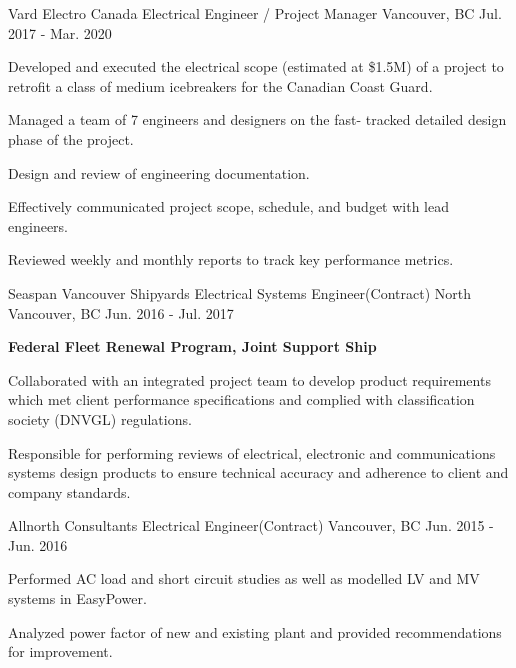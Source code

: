 \begin{cventries}
    \cventry
    {Vard Electro Canada} %
    {Electrical Engineer / Project Manager} %
    {Vancouver, BC} %
    {Jul. 2017 - Mar. 2020} %
    { %
        \begin{cvitems}
            \item {Developed and executed the electrical scope (estimated at \$1.5M) of a project to retrofit a class of medium icebreakers for the Canadian Coast Guard.}
            \item {Managed a team of 7 engineers and designers on the fast- tracked detailed design phase of the project.}
            \item {Design and review of engineering documentation.}
            \item {Effectively communicated project scope, schedule, and budget with lead engineers.}
            \item {Reviewed weekly and monthly reports to track key performance metrics.}
        \end{cvitems}
    }

    \cventry
    {Seaspan Vancouver Shipyards} %
    {Electrical Systems Engineer(Contract)} %
    {North Vancouver, BC} %
    {Jun. 2016 - Jul. 2017} %
    { %
        \begin{cvitems}
            \item[]\textbf{Federal Fleet Renewal Program, Joint Support Ship}
            \item {Collaborated with an integrated project team to develop product requirements which met client performance specifications and complied with classification society (DNVGL) regulations.}
            \item {Responsible for performing reviews of electrical, electronic and communications systems design products to ensure technical accuracy and adherence to client and company standards.}
        \end{cvitems}
    }

    \cventry
    {Allnorth Consultants} %
    {Electrical Engineer(Contract)} %
    {Vancouver, BC} %
    {Jun. 2015 - Jun. 2016} %
    { %
        \begin{cvitems}
            \item {Performed AC load and short circuit studies as well as modelled LV and MV systems in EasyPower.}
            \item{Analyzed power factor of new and existing plant and provided recommendations for improvement.}
        \end{cvitems}
    }


\end{cventries}
